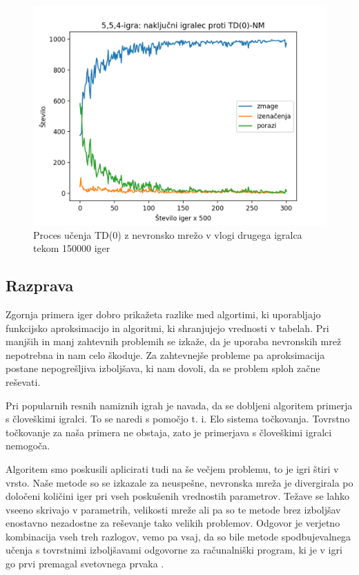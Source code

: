 \documentclass[12pt,a4paper]{amsart}
\theoremstyle{definition} %
\theoremstyle{plain} %
\begin{document}
\begin{figure}[H]
    \includegraphics[scale=0.725]{../rezultati/tdnn-554-150000-2.png}
    \caption{Proces učenja TD($0$) z nevronsko mrežo v vlogi drugega igralca tekom 150000 iger}
\end{figure}

\subsection{Razprava}
Zgornja primera iger dobro prikažeta razlike med algortimi, ki uporabljajo funkcijsko aproksimacijo 
in algoritmi, ki shranjujejo vrednosti v tabelah. Pri manjših in manj zahtevnih problemih se izkaže, 
da je uporaba nevronskih mrež nepotrebna in nam celo škoduje. Za zahtevnejše probleme pa aproksimacija
postane nepogrešljiva izboljšava, ki nam dovoli, da se problem sploh začne reševati. 

Pri popularnih resnih namiznih igrah je navada, da se dobljeni algoritem primerja s človeškimi igralci. 
To se naredi s pomočjo t. i. Elo sistema točkovanja. Tovrstno točkovanje za naša primera ne obstaja, zato 
je primerjava s človeškimi igralci nemogoča. 

Algoritem smo poskusili aplicirati tudi na še večjem problemu, to je igri štiri v vrsto. Naše metode so 
se izkazale za neuspešne, nevronska mreža je divergirala po določeni količini iger pri vseh poskušenih 
vrednostih parametrov. Težave se lahko vseeno skrivajo v parametrih, velikosti mreže ali pa so te metode 
brez izboljšav enostavno nezadostne za reševanje tako velikih problemov. Odgovor je verjetno kombinacija 
vseh treh razlogov, vemo pa vsaj, da so bile metode spodbujevalnega učenja s tovrstnimi izboljšavami 
odgovorne za računalniški program, ki je v igri go prvi premagal svetovnega prvaka \cite{go}.
\end{document}
